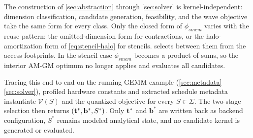 The construction of \autoref{sec:abstraction} through \autoref{sec:solver} is kernel-independent: dimension classification, candidate generation, feasibility, and the wave objective take the same form for every class. Only the closed form of \(\phi_{\mathit{smem}}\) varies with the reuse pattern: the omitted-dimension form for contractions, or the halo-amortization form of \autoref{eq:stencil-halo} for stencils. \name selects between them from the access footprints. In the stencil case \(\phi_{\mathit{smem}}\) becomes a product of sums, so the interior AM-GM optimum no longer applies and \name evaluates all candidates.

Tracing this end to end on the running GEMM example (\autoref{sec:metadata}\textendash\autoref{sec:solver}), profiled hardware constants and extracted schedule metadata instantiate \(\mathcal{V}(S)\) and the quantized objective for every \(S\in\Sigma\). The two-stage selection then returns \((\mathbf{t}^*,\mathbf{b}^*,S^*)\). Only \(\mathbf{t}^*\) and \(\mathbf{b}^*\) are written back as backend configuration, \(S^*\) remains modeled analytical state, and no candidate kernel is generated or evaluated.
